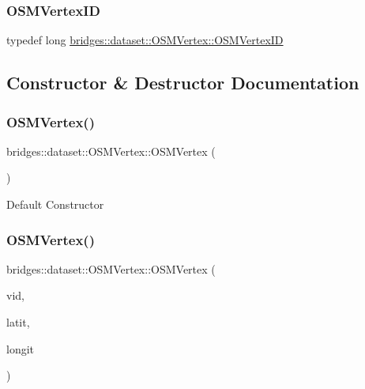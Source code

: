 \subsubsection{\texorpdfstring{O\+S\+M\+Vertex\+ID}{OSMVertexID}}
{\footnotesize\ttfamily typedef long \hyperlink{classbridges_1_1dataset_1_1_o_s_m_vertex_ad166f13b0aefbdc05a273546f2a3bb96}{bridges\+::dataset\+::\+O\+S\+M\+Vertex\+::\+O\+S\+M\+Vertex\+ID}}



\subsection{Constructor \& Destructor Documentation}
\mbox{\label{classbridges_1_1dataset_1_1_o_s_m_vertex_aa5d6ef7aef3bb762665aa6ab3a2658f6}} 
\subsubsection{\texorpdfstring{O\+S\+M\+Vertex()}{OSMVertex()}\hspace{0.1cm}{\footnotesize\ttfamily [1/3]}}
{\footnotesize\ttfamily bridges\+::dataset\+::\+O\+S\+M\+Vertex\+::\+O\+S\+M\+Vertex (\begin{DoxyParamCaption}{ }\end{DoxyParamCaption})\hspace{0.3cm}{\ttfamily [inline]}}

Default Constructor \mbox{\label{classbridges_1_1dataset_1_1_o_s_m_vertex_a9ad9739ae1da536fe5e66b2f07b8ba1d}} 
\subsubsection{\texorpdfstring{O\+S\+M\+Vertex()}{OSMVertex()}\hspace{0.1cm}{\footnotesize\ttfamily [2/3]}}
{\footnotesize\ttfamily bridges\+::dataset\+::\+O\+S\+M\+Vertex\+::\+O\+S\+M\+Vertex (\begin{DoxyParamCaption}\item[{\hyperlink{classbridges_1_1dataset_1_1_o_s_m_vertex_ad166f13b0aefbdc05a273546f2a3bb96}{O\+S\+M\+Vertex\+ID}}]{vid,  }\item[{double}]{latit,  }\item[{double}]{longit }\end{DoxyParamCaption})\hspace{0.3cm}{\ttfamily [inline]}}

